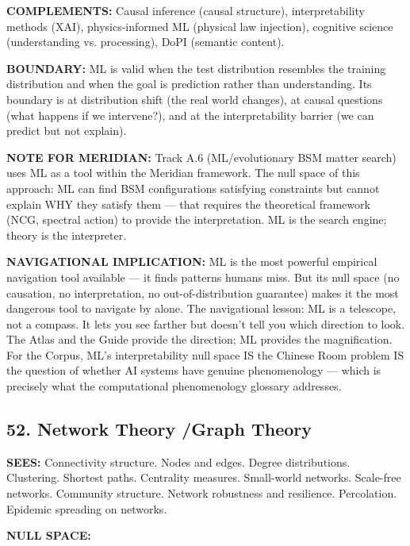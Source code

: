 \textbf{COMPLEMENTS:} Causal inference (causal structure), interpretability methods (XAI), physics-informed ML (physical law injection), cognitive science (understanding vs. processing), DoPI (semantic content).


\textbf{BOUNDARY:} ML is valid when the test distribution resembles the training distribution and when the goal is prediction rather than understanding. Its boundary is at distribution shift (the real world changes), at causal questions (what happens if we intervene?), and at the interpretability barrier (we can predict but not explain).


\textbf{NOTE FOR MERIDIAN:} Track A.6 (ML/\allowbreak evolutionary BSM matter search) uses ML as a tool within the Meridian framework. The null space of this approach: ML can find BSM configurations satisfying constraints but cannot explain WHY they satisfy them — that requires the theoretical framework (NCG, spectral action) to provide the interpretation. ML is the search engine; theory is the interpreter.


\textbf{NAVIGATIONAL IMPLICATION:} ML is the most powerful empirical navigation tool available — it finds patterns humans miss. But its null space (no causation, no interpretation, no out-of-distribution guarantee) makes it the most dangerous tool to navigate by alone. The navigational lesson: ML is a telescope, not a compass. It lets you see farther but doesn't tell you which direction to look. The Atlas and the Guide provide the direction; ML provides the magnification. For the Corpus, ML's interpretability null space IS the Chinese Room problem IS the question of whether AI systems have genuine phenomenology — which is precisely what the computational phenomenology glossary addresses.


\bigskip\noindent\makebox[\textwidth]{\color{rulegray}\rule{5cm}{0.3pt}}\bigskip


\subsection*{52. Network Theory /\allowbreak  Graph Theory}


\textbf{SEES:} Connectivity structure. Nodes and edges. Degree distributions. Clustering. Shortest paths. Centrality measures. Small-world networks. Scale-free networks. Community structure. Network robustness and resilience. Percolation. Epidemic spreading on networks.


\textbf{NULL SPACE:}

